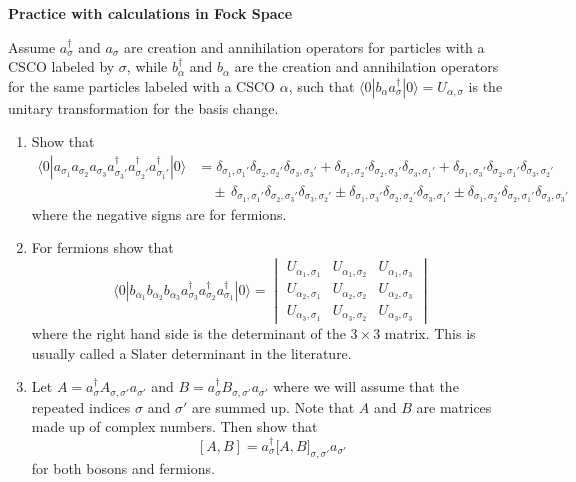 \begin{homeworkProblem}
\textbf{Practice with calculations in Fock Space}

Assume $a_\sigma^\dagger$ and $a_\sigma$ are creation and annihilation operators for particles with a CSCO labeled by $\sigma$, while $b_\alpha^\dagger$ and $b_\alpha$ are the creation and annihilation operators for the same particles labeled with a CSCO $\alpha$, such that $\langle 0|b_\alpha a_\sigma^\dagger|0\rangle = U_{\alpha,\sigma}$ is the unitary transformation for the basis change.

\begin{enumerate}
\item[(a)] Show that
\begin{align*}
\langle 0|a_{\sigma_1} a_{\sigma_2} a_{\sigma_3} a_{\sigma_3'}^\dagger a_{\sigma_2'}^\dagger a_{\sigma_1'}^\dagger|0\rangle
&= \delta_{\sigma_1,\sigma_1'}\delta_{\sigma_2,\sigma_2'}\delta_{\sigma_3,\sigma_3'}
+ \delta_{\sigma_1,\sigma_2'}\delta_{\sigma_2,\sigma_3'}\delta_{\sigma_3,\sigma_1'}
+ \delta_{\sigma_1,\sigma_3'}\delta_{\sigma_2,\sigma_1'}\delta_{\sigma_3,\sigma_2'} \\
&\quad \pm\, \delta_{\sigma_1,\sigma_1'}\delta_{\sigma_2,\sigma_3'}\delta_{\sigma_3,\sigma_2'}
\pm \delta_{\sigma_1,\sigma_3'}\delta_{\sigma_2,\sigma_2'}\delta_{\sigma_3,\sigma_1'}
\pm \delta_{\sigma_1,\sigma_2'}\delta_{\sigma_2,\sigma_1'}\delta_{\sigma_3,\sigma_3'}
\end{align*}
where the negative signs are for fermions.

\item[(b)] For fermions show that
\[
\langle 0|b_{\alpha_1} b_{\alpha_2} b_{\alpha_3} a_{\sigma_3}^\dagger a_{\sigma_2}^\dagger a_{\sigma_1}^\dagger|0\rangle
=
\begin{vmatrix}
U_{\alpha_1,\sigma_1} & U_{\alpha_1,\sigma_2} & U_{\alpha_1,\sigma_3} \\
U_{\alpha_2,\sigma_1} & U_{\alpha_2,\sigma_2} & U_{\alpha_2,\sigma_3} \\
U_{\alpha_3,\sigma_1} & U_{\alpha_3,\sigma_2} & U_{\alpha_3,\sigma_3}
\end{vmatrix}
\]
where the right hand side is the determinant of the $3\times 3$ matrix. This is usually called a Slater determinant in the literature.

\item[(c)] Let $A = a_\sigma^\dagger A_{\sigma,\sigma'} a_{\sigma'}$ and $B = a_\sigma^\dagger B_{\sigma,\sigma'} a_{\sigma'}$ where we will assume that the repeated indices $\sigma$ and $\sigma'$ are summed up. Note that $A$ and $B$ are matrices made up of complex numbers. Then show that
\[
[A,B] = a_\sigma^\dagger \big[A,B\big]_{\sigma,\sigma'} a_{\sigma'}
\]
for both bosons and fermions.
\end{enumerate}
\end{homeworkProblem}

